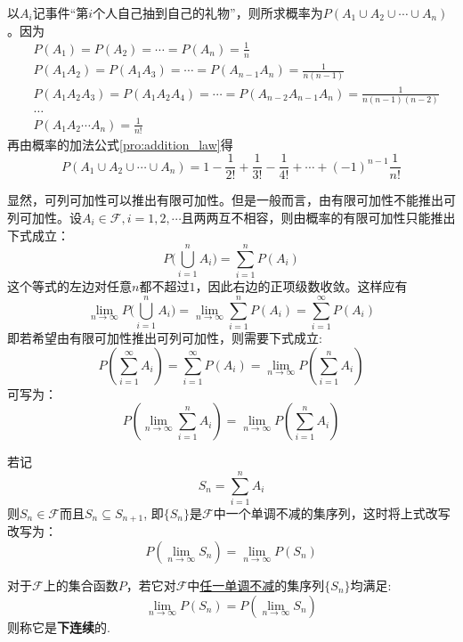 \begin{solution}
    以$A_i$记事件“第$i$个人自己抽到自己的礼物”，则所求概率为$P(A_1 \cup A_2 \cup \dotsb \cup A_n)$。因为
    \begin{align*}
         & P(A_1) = P(A_2) = \dotsb = P(A_n) =\frac1{n}                                              \\
         & P(A_1 A_2) = P(A_1 A_3) = \dotsb = P(A_{n-1} A_n) = \frac1{n (n-1)}                       \\
         & P(A_1 A_2 A_3) = P(A_1 A_2 A_4) = \dotsb = P(A_{n-2} A_{n-1} A_n) = \frac1{n (n-1) (n-2)} \\
         & \ldots                                                                                    \\
         & P(A_1 A_2 \dotsb A_n) = \frac1{n!}
    \end{align*}
    再由概率的加法公式\ref{pro:addition_law}得
    \[ P(A_1 \cup A_2 \cup \dotsb \cup A_n) = 1 - \frac1{2!} + \frac1{3!} - \frac1{4!} + \dotsb + (-1)^{n-1} \frac1{n!} \]
\end{solution}

显然，可列可加性可以推出有限可加性。但是一般而言，由有限可加性不能推出可列可加性。设$A_i \in \mathscr{F}, i=1,2,\cdots $且两两互不相容，则由概率的有限可加性只能推出下式成立：
\[ P\biggl( \bigcup _{i=1} ^n A_i \biggr)=\sum_{i=1}^n P(A_i) \]
这个等式的左边对任意$n$都不超过$1$，因此右边的正项级数收敛。这样应有
\[ \lim_{n \to \infty}P\biggl(\bigcup_{i=1}^n A_i \biggr) =\lim_{n \to \infty}\sum_{i=1}^n P(A_i)=\sum_{i=1}^{\infty} P(A_i) \]
即若希望由有限可加性推出可列可加性，则需要下式成立:
\[ P(\sum_{i=1}^{\infty} A_i)=\sum_{i=1}^{\infty} P(A_i)=\lim_{n \to \infty}P(\sum_{i=1}^n A_i) \]
可写为：
\[ P(\lim_{n \to \infty}\sum_{i=1}^{n} A_i)=\lim_{n \to \infty}P(\sum_{i=1}^n A_i) \]

若记
\[ S_n=\sum_{i=1}^n A_i \]
则$S_n \in \mathscr{F}$而且$S_n \subseteq S_{n+1}$, 即$\{ S_n \}$是$\mathscr{F}$中一个单调不减的集序列，这时将上式改写改写为：
\[ P(\lim_{n \to \infty}S_n)=\lim_{n \to \infty}P(S_n) \]

\begin{definition}[下连续]
    对于$\mathscr{F}$上的集合函数$P$，若它对$\mathscr{F}$中\underline{任一单调不减}的集序列$\{ S_n \}$均满足:
    \[ \lim_{n \to \infty}P(S_n) =P(\lim_{n \to \infty} S_n) \]
    则称它是\textbf{下连续}的.
\end{definition}

